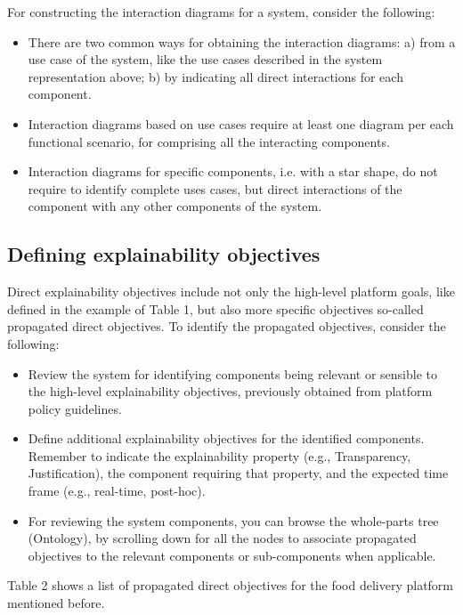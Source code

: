 \documentclass[preprint,10pt]{elsarticle}
\begin{document}
For constructing the interaction diagrams for a system, consider the following:
\begin{itemize}
    \item There are two common ways for obtaining the interaction diagrams: a) from a use case of the system, like the use cases described in the system representation above; b) by indicating all direct interactions for each component.
    \item Interaction diagrams based on use cases require at least one diagram per each functional scenario, for comprising all the interacting components.
    \item Interaction diagrams for specific components, i.e. with a star shape, do not require to identify complete uses cases, but direct interactions of the component with any other components of the system.
\end{itemize}

\subsection{Defining explainability objectives}

Direct explainability objectives include not only the high-level platform goals, like defined in the example of Table 1, but also more specific objectives so-called propagated direct objectives. To identify the propagated objectives, consider the following:

\begin{itemize}
    \item Review the system for identifying components being relevant or sensible to the high-level explainability objectives, previously obtained from platform policy guidelines.
    \item Define additional explainability objectives for the identified components. Remember to indicate the explainability property (e.g., Transparency, Justification), the component requiring that property, and the expected time frame (e.g., real-time, post-hoc).
    \item For reviewing the system components, you can browse the whole-parts tree (Ontology), by scrolling down for all the nodes to associate propagated objectives to the relevant components or sub-components when applicable.
\end{itemize}

Table 2 shows a list of propagated direct objectives for the food delivery platform mentioned before.
\end{document}
